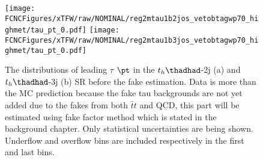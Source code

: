 \begin{figure}[H]
\centering
\texttt{[image: \\FCNCFigures/xTFW/raw/NOMINAL/reg2mtau1b2jos\_vetobtagwp70\_highmet/tau\_pt\_0.pdf]}
\texttt{[image: \\FCNCFigures/xTFW/raw/NOMINAL/reg2mtau1b3jos\_vetobtagwp70\_highmet/tau\_pt\_0.pdf]}
\caption{ The distributions of leading $\tau$ $\pt$ in the $t_h\thadhad$-2j (a) and $t_h\thadhad$-3j (b) SR before the fake estimation. Data is more than the MC prediction because the fake tau backgrounds are not yet added due to the fakes from both $\bar{t}t$ and QCD, this part will be estimated using fake factor method which is stated in the background chapter. Only
statistical uncertainties are being shown. Underflow and overflow bins are included respectively in the first and last bins.}
\label{fig:intro_os_pre_hadhad}
\end{figure}

